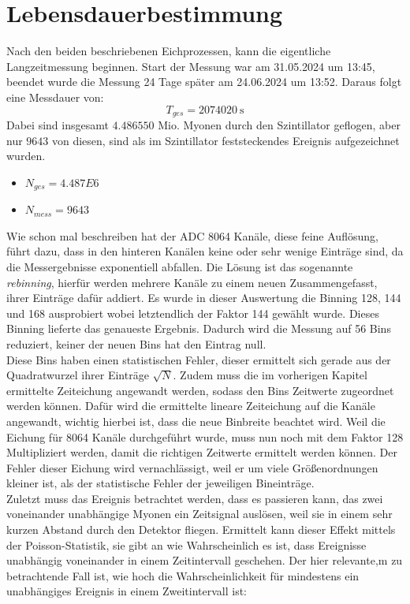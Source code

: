 \documentclass[12pt,a4paper,ngerman]{report}
\begin{document}
		
	\section{Lebensdauerbestimmung}
	Nach den beiden beschriebenen Eichprozessen, kann die eigentliche Langzeitmessung beginnen. Start der Messung war am 31.05.2024 um 13:45, beendet wurde die Messung 24 Tage später am 24.06.2024 um 13:52. Daraus folgt eine Messdauer von:
	\begin{equation}
		T_{ges} = \SI{2074020}{\second}
	\end{equation}
	Dabei sind insgesamt $4.486550$ Mio. Myonen durch den Szintillator geflogen, aber nur $9643$ von diesen, sind als im Szintillator feststeckendes Ereignis aufgezeichnet wurden.
	\begin{itemize}
		\item $N_{ges} = 4.487E6$
		\item $N_{mess} = 9643$
	\end{itemize}
	Wie schon mal beschreiben hat der ADC 8064 Kanäle, diese feine Auflösung, führt dazu, dass in den hinteren Kanälen keine oder sehr wenige Einträge sind, da die Messergebnisse exponentiell abfallen. Die Lösung ist das sogenannte \textit{rebinning}, hierfür werden mehrere Kanäle zu einem neuen Zusammengefasst, ihrer Einträge dafür addiert. Es wurde in dieser Auswertung die Binning 128, 144 und 168 ausprobiert wobei letztendlich der Faktor 144 gewählt wurde. Dieses Binning lieferte das genaueste Ergebnis. Dadurch wird die Messung auf 56 Bins reduziert, keiner der neuen Bins hat den Eintrag null.\\
	Diese Bins haben einen statistischen Fehler, dieser ermittelt sich gerade aus der Quadratwurzel ihrer Einträge $\sqrt{N}$. Zudem muss die im vorherigen Kapitel ermittelte Zeiteichung angewandt werden, sodass den Bins Zeitwerte zugeordnet werden können. Dafür wird die ermittelte lineare Zeiteichung auf die Kanäle angewandt, wichtig hierbei ist, dass die neue Binbreite beachtet wird. Weil die Eichung für 8064 Kanäle durchgeführt wurde, muss nun noch mit dem Faktor 128 Multipliziert werden, damit die richtigen Zeitwerte ermittelt werden können. Der Fehler dieser Eichung wird vernachlässigt, weil er um viele Größenordnungen kleiner ist, als der statistische Fehler der jeweiligen Bineinträge.\\
	Zuletzt muss das Ereignis betrachtet werden, dass es passieren kann, das zwei voneinander unabhängige Myonen ein Zeitsignal auslösen, weil sie in einem sehr kurzen Abstand durch den Detektor fliegen. Ermittelt kann dieser Effekt mittels der Poisson-Statistik, sie gibt an wie Wahrscheinlich es ist, dass Ereignisse unabhängig voneinander in einem Zeitintervall geschehen. Der hier relevante,m zu betrachtende Fall ist, wie hoch die Wahrscheinlichkeit für mindestens ein unabhängiges Ereignis in einem Zweitintervall ist:
\end{document}
